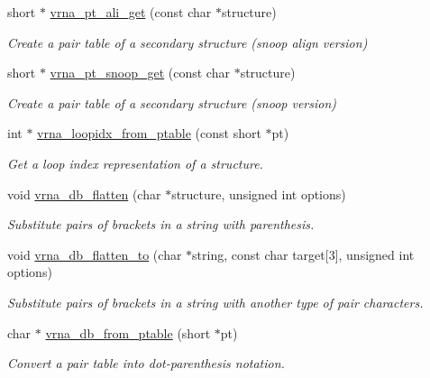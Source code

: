 \begin{DoxyCompactItemize}
short $\ast$ \mbox{\hyperlink{group__struct__utils_ga1ee4cdcda1f57d32dcb38032116d335d}{vrna\+\_\+pt\+\_\+ali\+\_\+get}} (const char $\ast$structure)
\begin{DoxyCompactList}\small\item\em Create a pair table of a secondary structure (snoop align version) \end{DoxyCompactList}\item 
short $\ast$ \mbox{\hyperlink{group__struct__utils_gaef0f7e1a6c00c81a349973de53039dda}{vrna\+\_\+pt\+\_\+snoop\+\_\+get}} (const char $\ast$structure)
\begin{DoxyCompactList}\small\item\em Create a pair table of a secondary structure (snoop version) \end{DoxyCompactList}\item 
int $\ast$ \mbox{\hyperlink{group__struct__utils_ga03e15af299be0866ff21da880c74b92e}{vrna\+\_\+loopidx\+\_\+from\+\_\+ptable}} (const short $\ast$pt)
\begin{DoxyCompactList}\small\item\em Get a loop index representation of a structure. \end{DoxyCompactList}\item 
void \mbox{\hyperlink{group__struct__utils_gae966b9f44168a4f4b39ca42ffb5f37b7}{vrna\+\_\+db\+\_\+flatten}} (char $\ast$structure, unsigned int options)
\begin{DoxyCompactList}\small\item\em Substitute pairs of brackets in a string with parenthesis. \end{DoxyCompactList}\item 
void \mbox{\hyperlink{group__struct__utils_ga690425199c8b71545e7196e3af1436f8}{vrna\+\_\+db\+\_\+flatten\+\_\+to}} (char $\ast$string, const char target\mbox{[}3\mbox{]}, unsigned int options)
\begin{DoxyCompactList}\small\item\em Substitute pairs of brackets in a string with another type of pair characters. \end{DoxyCompactList}\item 
char $\ast$ \mbox{\hyperlink{group__struct__utils_gaf9ecd0d7877fecdbb0292e24f40283d5}{vrna\+\_\+db\+\_\+from\+\_\+ptable}} (short $\ast$pt)
\begin{DoxyCompactList}\small\item\em Convert a pair table into dot-\/parenthesis notation. \end{DoxyCompactList}\item 

\end{DoxyCompactItemize}

